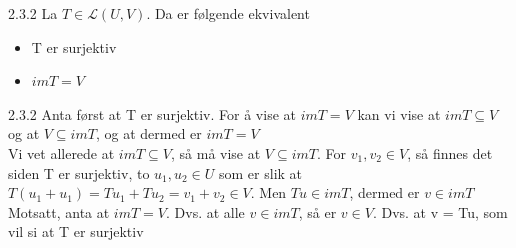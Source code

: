 \documentclass[a4paper,norsk]{article}
\begin{document}
\begin{lemmabox}{2.3.2}{}
La $ T \in \mathcal{L} \left( U, V \right)  $. Da er følgende ekvivalent
\begin{itemize}
  \item T er surjektiv
  \item $ im T = V $ 
\end{itemize}

\begin{proofbox}{2.3.2}{}
Anta først at T er surjektiv. For å vise at $ im T = V $ kan vi vise at $ im T\subseteq V $ og at $ V \subseteq im T $, og at dermed er $ im T = V $ \\

Vi vet allerede at $ im T \subseteq V $, så må vise at $ V \subseteq im T $. For $ v_1, v_2 \in  V $, så finnes det siden T er surjektiv, to $ u_1, u_2 \in  U $ som er slik at $ T \left( u_1 + u_1 \right) = Tu_1 + Tu_2 = v_1 + v_2 \in V $. Men $ Tu \in  im T $, dermed er $ v \in im T $ \\

Motsatt, anta at $ im T = V $. Dvs. at alle $ v \in  im T $, så er $ v \in V $. Dvs. at v = Tu, som vil si at T er surjektiv
\end{proofbox}
\end{lemmabox}
\end{document}

